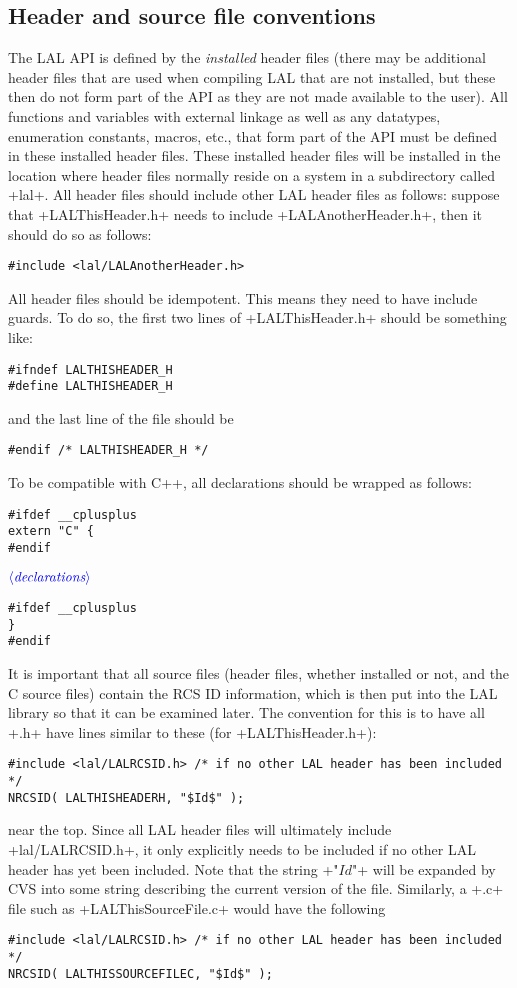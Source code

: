 \documentclass[10pt]{ligodcc}
\makeatletter
\def\verb{\relax\ifmmode\hbox\else\leavevmode\null\fi
  \bgroup
    \color{blue}\small
    \verb@eol@error \let\do\@makeother \dospecials
    \verbatim@font\@noligs
    \@ifstar\@sverb\@verb}
\newcommand{\opt}[1]{\ensuremath{\color{blue}\langle\textit{#1}\rangle}}
\makeatother
\begin{document}
\subsection{Header and source file conventions}

The LAL API is defined by the \emph{installed} header files (there may be
additional header files that are used when compiling LAL that are not
installed, but these then do not form part of the API as they are not made
available to the user).  All functions and variables with external linkage
as well as any datatypes, enumeration constants, macros, etc., that form
part of the API must be defined in these installed header files.
These installed header files will be installed in the location where header
files normally reside on a system in a subdirectory called \verb+lal+.  All
header files should include other LAL header files as follows: suppose
that \verb+LALThisHeader.h+ needs to include \verb+LALAnotherHeader.h+, then it
should do so as follows:
\begin{verbatim}
#include <lal/LALAnotherHeader.h>
\end{verbatim}

All header files should be idempotent.  This means they need to have include
guards.  To do so, the first two lines of \verb+LALThisHeader.h+ should be
something like:
\begin{verbatim}
#ifndef LALTHISHEADER_H
#define LALTHISHEADER_H
\end{verbatim}
and the last line of the file should be
\begin{verbatim}
#endif /* LALTHISHEADER_H */
\end{verbatim}

To be compatible with C++, all declarations should be wrapped as follows:
\begin{verbatim}
#ifdef __cplusplus
extern "C" {
#endif
\end{verbatim}
\opt{declarations}
\begin{verbatim}
#ifdef __cplusplus
}
#endif
\end{verbatim}

It is important that all source files (header files, whether installed or not,
and the C source files) contain the RCS ID information, which is then put into
the LAL library so that it can be examined later.  The convention for this
is to have all \verb+.h+ have lines similar to these (for
\verb+LALThisHeader.h+):
\begin{verbatim}
#include <lal/LALRCSID.h> /* if no other LAL header has been included */
NRCSID( LALTHISHEADERH, "$Id$" );
\end{verbatim}
near the top.  Since all LAL header files will ultimately include
\verb+lal/LALRCSID.h+, it only explicitly needs to be included if no other
LAL header has yet been included.  Note that the string \verb+"$Id$"+ will
be expanded by CVS into some string describing the current version of the file.
Similarly, a \verb+.c+ file such as \verb+LALThisSourceFile.c+ would have
the following
\begin{verbatim}
#include <lal/LALRCSID.h> /* if no other LAL header has been included */
NRCSID( LALTHISSOURCEFILEC, "$Id$" );
\end{verbatim}
\end{document}
